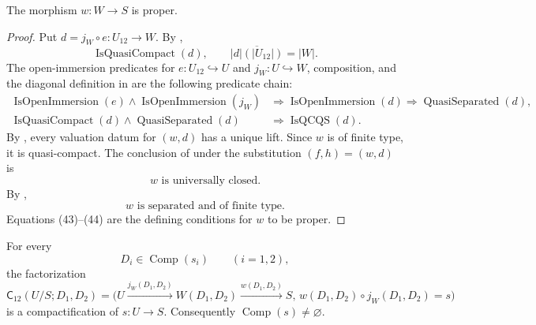 \begin{lemma}
  \label{lemma:nagata-two-open-candidate-proper}
  \lean{}

  The morphism $w\colon W\to S$ is proper.
\end{lemma}

\begin{proof}
  Put $d=j_W\circ e\colon U_{12}\to W$.  By
  ,
  \[
    \operatorname{IsQuasiCompact}(d),\qquad
    \overline{|d|(|U_{12}|)}=|W|.
  \]
  The open-immersion predicates for $e\colon U_{12}\hookrightarrow U$ and
  $j_W\colon U\hookrightarrow W$, composition, and the diagonal definition
  in  are the following
  predicate chain:
  \[
  \begin{aligned}
    \operatorname{IsOpenImmersion}(e)\wedge
      \operatorname{IsOpenImmersion}(j_W)
      &\Longrightarrow\operatorname{IsOpenImmersion}(d)
       \Longrightarrow\operatorname{QuasiSeparated}(d),\\
    \operatorname{IsQuasiCompact}(d)\wedge
      \operatorname{QuasiSeparated}(d)
      &\Longrightarrow\operatorname{IsQCQS}(d).
  \end{aligned}
  \]
  By , every valuation datum for
  $(w,d)$ has a unique lift.  Since $w$ is of finite type, it is
  quasi-compact.  The conclusion of
   under the substitution
  $(f,h)=(w,d)$ is
  \[
    w\text{ is universally closed}.                               \tag{43}
  \]
  By ,
  \[
    w\text{ is separated and of finite type}.                     \tag{44}
  \]
  Equations (43)--(44) are the defining conditions for $w$ to be proper.
\end{proof}

\begin{theorem}
  \label{thm:nagata-two-open}
  \lean{}

  For every
  \[
    D_i\in\operatorname{Comp}(s_i)\qquad(i=1,2),
  \]
  the factorization
  \[
    \mathsf C_{12}(U/S;D_1,D_2)
      =
      \bigl(
        U\xrightarrow{j_W(D_1,D_2)}W(D_1,D_2)
          \xrightarrow{w(D_1,D_2)}S,\,
        w(D_1,D_2)\circ j_W(D_1,D_2)=s
      \bigr)
  \]
  is a compactification of $s\colon U\to S$.  Consequently
  $\operatorname{Comp}(s)\neq\varnothing$.
\end{theorem}

